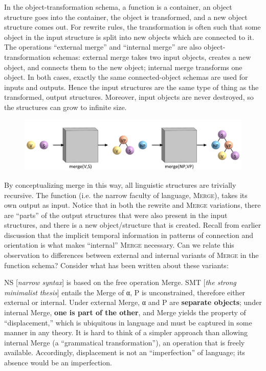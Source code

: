   In the object-transformation schema, a function is a container, an object structure goes into the container, the object is transformed, and a new object structure comes out. For rewrite rules, the transformation is often such that some object in the input structure is split into new objects which are connected to it. The operations “external merge” and “internal merge” are also object-transformation schemas: external merge takes two input objects, creates a new object, and connects them to the new object; internal merge transforms one object. In both cases, exactly the same connected-object schemas are used for inputs and outputs. Hence the input structures are the same type of thing as the transformed, output structures. Moreover, input objects are never destroyed, so the structures can grow to infinite size.

  
\begin{figure}
\includegraphics[width=\textwidth]{figures/Tilsen-img108.png}
\caption{\missingcaption}
\label{fig:}
\end{figure}
 

  By conceptualizing merge in this way, all linguistic structures are trivially recursive. The function (i.e. the narrow faculty of language, \textsc{Merge}), takes its own output as input. Notice that in both the rewrite and \textsc{Merge} variations, there are “parts” of the output structures that were also present in the input structures, and there is a new object/structure that is created. Recall from earlier discussion that the implicit temporal information in patterns of connection and orientation is what makes “internal” \textsc{Merge} necessary. Can we relate this observation to differences between external and internal variants of \textsc{Merge} in the function schema? Consider what has been written about these variants:

NS [\textit{narrow syntax}] is based on the free operation Merge. SMT [\textit{the strong minimalist thesis}] entails the Merge of α, P is unconstrained, therefore either external or internal. Under external Merge, α and P are \textbf{separate objects}; under internal Merge, \textbf{one is part of the other}, and Merge yields the property of “displacement,” which is ubiquitous in language and must be captured in some manner in any theory. It is hard to think of a simpler approach than allowing internal Merge (a “grammatical transformation”), an operation that is freely available. Accordingly, displacement is not an “imperfection” of language; its absence would be an imperfection. \citep{Chomsky2001b}

